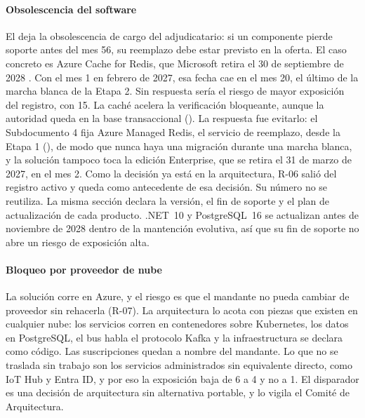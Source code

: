 \paragraph{Obsolescencia del software}
El  deja la obsolescencia de cargo del adjudicatario: si un componente pierde
soporte antes del mes 56, su reemplazo debe estar previsto en la oferta. El caso concreto es Azure Cache
for Redis, que Microsoft retira el 30 de septiembre de 2028 \parencite{ms_redis_retiro}. Con el mes 1 en
febrero de 2027, esa fecha cae en el mes 20, el último de la marcha blanca de la Etapa 2. Sin respuesta
sería el riesgo de mayor exposición del registro, con 15. La caché acelera la verificación bloqueante,
aunque la autoridad queda en la base transaccional (). La respuesta fue
evitarlo: el Subdocumento 4 fija Azure Managed Redis, el servicio de reemplazo, desde la Etapa 1
(), de modo que nunca haya una migración durante una marcha blanca, y la
solución tampoco toca la edición Enterprise, que se retira el 31 de marzo de 2027, en el mes 2. Como la
decisión ya está en la arquitectura, R-06 salió del registro activo y queda como antecedente de esa
decisión. Su número no se reutiliza. La misma sección declara la versión, el fin de soporte y el
plan de actualización de cada producto. .NET~10 y PostgreSQL~16 se actualizan antes de noviembre de 2028
dentro de la mantención evolutiva, así que su fin de soporte no abre un riesgo de exposición alta.

\paragraph{Bloqueo por proveedor de nube}
La solución corre en Azure, y el riesgo es que el mandante no pueda cambiar de proveedor sin rehacerla
(R-07). La arquitectura lo acota con piezas que existen en cualquier nube: los servicios corren en
contenedores sobre Kubernetes, los datos en PostgreSQL, el bus habla el protocolo Kafka y la
infraestructura se declara como código. Las suscripciones quedan a nombre del mandante. Lo que no se
traslada sin trabajo son los servicios administrados sin equivalente directo, como IoT Hub y Entra ID,
y por eso la exposición baja de 6 a 4 y no a 1. El disparador es una decisión de arquitectura sin
alternativa portable, y lo vigila el Comité de Arquitectura.

